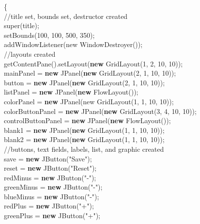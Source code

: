 \documentclass[12pt]{article}
\begin{document}
\begin{flushleft}
{\qquad \qquad		\{\\
\qquad \qquad \qquad			//title set, bounds set, destructor created\\
\qquad \qquad \qquad			super(title);\\		
\qquad \qquad \qquad			setBounds(100, 100, 500, 350);\\
\qquad \qquad \qquad			addWindowListener(new WindowDestroyer());\\  
			[2mm]
\qquad \qquad \qquad			//layouts created\\
\qquad \qquad \qquad			getContentPane().setLayout(\textbf{new} GridLayout(1, 2, 10, 10));\\
\qquad \qquad \qquad			mainPanel = \textbf{new} JPanel(\textbf{new} GridLayout(2, 1, 10, 10));\\
\qquad \qquad \qquad			button = \textbf{new} JPanel(\textbf{new} GridLayout(2, 1, 10, 10));\\
\qquad \qquad \qquad			listPanel = \textbf{new} JPanel(\textbf{new} FlowLayout());\\
\qquad \qquad \qquad			colorPanel = \textbf{new} JPanel(new GridLayout(1, 1, 10, 10));\\
\qquad \qquad \qquad			colorButtonPanel = \textbf{new} JPanel(\textbf{new} GridLayout(3, 4, 10, 10));\\
\qquad \qquad \qquad			controlButtonPanel = \textbf{new} JPanel(\textbf{new} FlowLayout());\\
\qquad \qquad \qquad			blank1 = \textbf{new} JPanel(\textbf{new} GridLayout(1, 1, 10, 10));\\
\qquad \qquad \qquad			blank2 = \textbf{new} JPanel(\textbf{new} GridLayout(1, 1, 10, 10));\\
			[2mm]
\qquad \qquad \qquad			//buttons, text fields, labels, list, and graphic created\\ 
\qquad \qquad \qquad			save = \textbf{new} JButton("Save");\\
\qquad \qquad \qquad			reset = \textbf{new} JButton("Reset");\\
\qquad \qquad \qquad			redMinus = \textbf{new} JButton("-");\\
\qquad \qquad \qquad			greenMinus = \textbf{new} JButton("-");\\
\qquad \qquad \qquad			blueMinus = \textbf{new} JButton("-");\\
\qquad \qquad \qquad			redPlus = \textbf{new} JButton("+");\\
\qquad \qquad \qquad			greenPlus = \textbf{new} JButton("+");\\
}
\end{flushleft}
\end{document}
